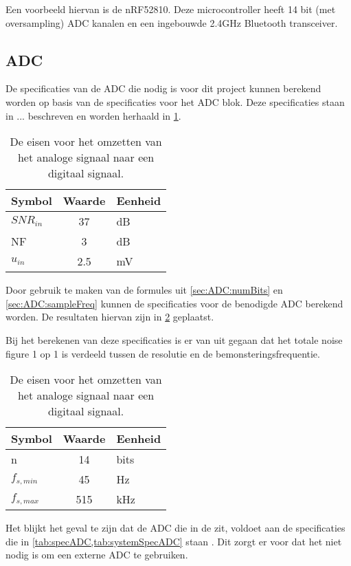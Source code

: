 Een voorbeeld hiervan is de nRF52810. Deze microcontroller heeft 14 bit (met oversampling) ADC kanalen en een ingebouwde 2.4GHz Bluetooth transceiver. 


\subsection{ADC}
De specificaties van de ADC die nodig is voor dit project kunnen berekend worden op basis van de specificaties voor het ADC blok. Deze specificaties staan in ... beschreven en worden herhaald in \cref{tab:systemSpecADC}.
\begin{table}[ht]
    \centering
    \begin{tabular}{l|c|l}
        Symbol      & Waarde & Eenheid\\\hline
        $SNR_{in}$  & 37        & dB\\
        NF          & 3         & dB\\
        $u_{in}$    & 2.5       & mV\\
    \end{tabular}
    \caption{De eisen voor het omzetten van het analoge signaal naar een digitaal signaal.}
    \label{tab:systemSpecADC}
\end{table}

Door gebruik te maken van de formules uit \cref{sec:ADC:numBits} en \cref{sec:ADC:sampleFreq} kunnen de specificaties voor de benodigde ADC berekend worden. De resultaten hiervan zijn in  \cref{tab:specADC} geplaatst. 

Bij het berekenen van deze specificaties is er van uit gegaan dat het totale noise figure 1 op 1 is verdeeld tussen de resolutie en de bemonsteringsfrequentie. 
\begin{table}[ht]
    \centering
    \begin{tabular}{l|c|l}
        Symbol      & Waarde    & Eenheid\\\hline
        n           & 14        & bits\\
        $f_{s,min}$ & 45        & Hz\\
        $f_{s,max}$ & 515       & kHz\\
    \end{tabular}
    \caption{De eisen voor het omzetten van het analoge signaal naar een digitaal signaal.}
    \label{tab:specADC}
\end{table}

Het blijkt het geval te zijn dat de ADC die in de \mcu  zit, voldoet aan de specificaties die in \cref{tab:specADC,tab:systemSpecADC} staan \cite{nrf52810}. Dit zorgt er voor dat het niet nodig is om een externe ADC te gebruiken.

